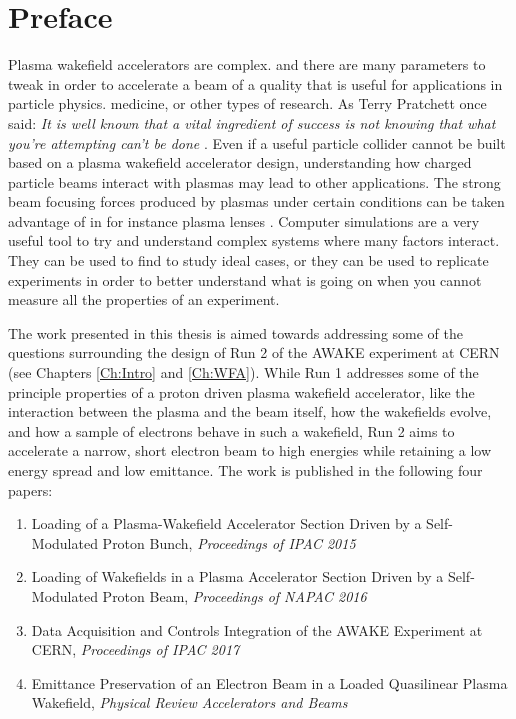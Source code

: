 \chapter*{Preface}

Plasma wakefield accelerators are complex. and there are many parameters to tweak in order to accelerate a beam of a quality that is useful for applications in particle physics. medicine, or other types of research. As Terry Pratchett once said: \textit{It is well known that a vital ingredient of success is not knowing that what you're attempting can't be done} \cite{pratchett:1987}. Even if a useful particle collider cannot be built based on a plasma wakefield accelerator design, understanding how charged particle beams interact with plasmas may lead to other applications. The strong beam focusing forces produced by plasmas under certain conditions can be taken advantage of in for instance plasma lenses \cite{su:1990}. Computer simulations are a very useful tool to try and understand complex systems where many factors interact. They can be used to find to study ideal cases, or they can be used to replicate experiments in order to better understand what is going on when you cannot measure all the properties of an experiment.

The work presented in this thesis is aimed towards addressing some of the questions surrounding the design of Run 2 of the AWAKE experiment at CERN (see Chapters \ref{Ch:Intro} and \ref{Ch:WFA}). While Run 1 addresses some of the principle properties of a proton driven plasma wakefield accelerator, like the interaction between the plasma and the beam itself, how the wakefields evolve, and how a sample of electrons behave in such a wakefield, Run 2 aims to accelerate a narrow, short electron beam to high energies while retaining a low energy spread and low emittance. The work is published in the following four papers:

\begin{enumerate}[I]
    \item Loading of a Plasma-Wakefield Accelerator Section Driven by a Self-Modulated Proton Bunch, \emph{Proceedings of IPAC 2015} \cite{berglyd_olsen:2015}
    \item Loading of Wakefields in a Plasma Accelerator Section Driven by a Self-Modulated Proton Beam, \emph{Proceedings of NAPAC 2016} \cite{berglyd_olsen:2016}
    \item Data Acquisition and Controls Integration of the AWAKE Experiment at CERN, \emph{Proceedings of IPAC 2017} \cite{berglyd_olsen:2017}
    \item Emittance Preservation of an Electron Beam in a Loaded Quasilinear Plasma Wakefield, \emph{Physical Review Accelerators and Beams} \cite{berglyd_olsen:2018}
\end{enumerate}

